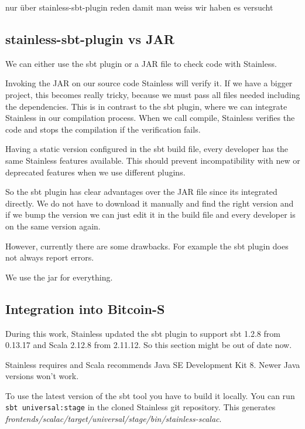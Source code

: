 \documentclass[runningheads]{llncs}
\newcommand{\todo}[1]{{\par \color{red}#1}}
\begin{document}
\todo{nur über stainless-sbt-plugin reden damit man weiss wir haben es versucht}



\subsection{stainless-sbt-plugin vs JAR}

We can either use the sbt plugin or a JAR file to check code with Stainless.

Invoking the JAR on our source code Stainless will verify it.  If we
have a bigger project, this becomes really tricky, because we must
pass all files needed including the dependencies.  This is in contrast
to the sbt plugin, where we can integrate Stainless in our compilation
process.  When we call compile, Stainless verifies the code and stops
the compilation if the verification fails.

Having a static version configured in the sbt build file, every
developer has the same Stainless features available.  This should
prevent incompatibility with new or deprecated features when we use
different plugins.

So the sbt plugin has clear advantages over the JAR file since its
integrated directly.  We do not have to download it manually and find
the right version and if we bump the version we can just edit it in
the build file and every developer is on the same version again.

However, currently there are some drawbacks.  For example the sbt
plugin does not always report errors.

We use the jar for everything. 

\subsection{Integration into Bitcoin-S}

During this work, Stainless updated the sbt plugin to support sbt
1.2.8 from 0.13.17 and Scala 2.12.8 from 2.11.12.  So this section
might be out of date now.

Stainless requires and Scala recommends Java SE Development Kit 8.
Newer Java versions won't work.

To use the latest version of the sbt tool you have to build it
locally.  You can run \texttt{sbt universal:stage} in the cloned
Stainless git repository.  This generates
\emph{frontends/scalac/target/universal/stage/bin/stainless-scalac}.
\end{document}
